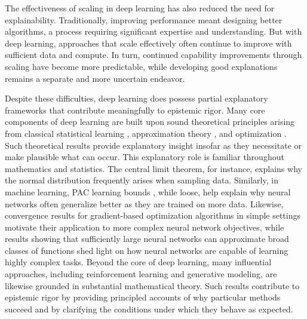 \documentclass{article}
\begin{document}
The effectiveness of scaling in deep learning has also reduced the need for explainability.
Traditionally, improving performance meant designing better algorithms, a process requiring significant expertise and understanding.
But with deep learning, approaches that scale effectively often continue to improve with sufficient data and compute.
In turn, continued capability improvements through scaling have become more predictable, while developing good explanations remains a separate and more uncertain endeavor.

Despite these difficulties, deep learning does possess partial explanatory frameworks that contribute meaningfully to epistemic rigor.
Many core components of deep learning are built upon sound theoretical principles arising from classical statistical learning \cite{Vapnik2000, ShalevShwartzBenDavid2014UML}, approximation theory \cite{pinkus1999approximation}, and optimization \cite{nocedal2006numerical, hazan2023introductiononlineconvexoptimization}.
Such theoretical results provide explanatory insight insofar as they necessitate or make plausible what can occur.
This explanatory role is familiar throughout mathematics and statistics.
The central limit theorem, for instance, explains why the normal distribution frequently arises when sampling data.
Similarly, in machine learning, PAC learning bounds \cite{ShalevShwartzBenDavid2014UML}, while loose, help explain why neural networks often generalize better as they are trained on more data.
Likewise, convergence results for gradient-based optimization algorithms in simple settings motivate their application to more complex neural network objectives, while results showing that sufficiently large neural networks can approximate broad classes of functions \cite{pinkus1999approximation} shed light on how neural networks are capable of learning highly complex tasks.
Beyond the core of deep learning, many influential approaches, including reinforcement learning and generative modeling, are likewise grounded in substantial mathematical theory.
Such results contribute to epistemic rigor by providing principled accounts of why particular methods succeed and by clarifying the conditions under which they behave as expected.
\end{document}
